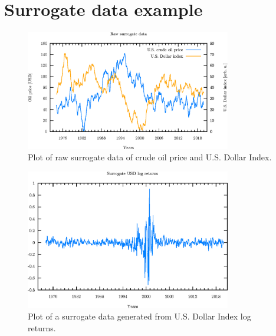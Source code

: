 \appendix
\section{Surrogate data example} \label{appendix:surrogate-example}

\begin{figure}[h]
\begin{center}
\includegraphics[width=0.8\textwidth]{./code/plot/surrogate_raw.eps}
\caption{Plot of raw surrogate data of crude oil price and U.S. Dollar Index.}
\label{fig:s-raw}
\end{center}
\end{figure}

\begin{figure}[h]
\begin{center}
\includegraphics[width=0.8\textwidth]{./code/plot/surrogate_dollar_logret.eps}
\caption{Plot of a surrogate data generated from U.S. Dollar Index log returns.}
\label{fig:s-usd-logret}
\end{center}
\end{figure}

